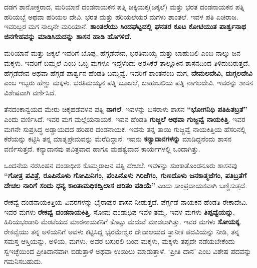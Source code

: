 \vskip -1pt

ದಡಗ ಶಾನೋಕ್ತರಾದ, ಮರಿಯಾನೆ ದಂಡನಾಯಕನ ಪತ್ನಿ ಜಕ್ಕಿಯಕ್ಕ(ಜಕ್ಕಲೆ) ಮತ್ತು ಭರತ ದಂಡನಾಯಕನ ಪತ್ನಿ ಹರಿಯಬ್ಬೆ ಅಥವಾ ಹರಿಯಲ ದೇವಿ. ಭರತ ಮತ್ತು ಹರಿಯಲೆಯರ ಮಗಳು ಶಾಂತಲೆ. ಇವಳ ಪತಿ ಏಚಿರಾಜ. ಇವರಿಬ್ಬರ ಮಗ ನಾಲ್ಕನೇ ಮರಿಯಾನೆ. \textbf{ಶಾಂತಲೆಯು ಸಿಂದಘಟ್ಟದಲ್ಲಿ ಘನತರ ಕೂಟ ಕೋಟಿಯುತ ಪಾರ್ಶ್ವನಾಥ ಜಿನಗೇಹವನ್ನು ಮಾಡಿಸಿದುದನ್ನು ಶಾಸನ ಹಾಡಿ ಹೊಗಳಿದೆ.}

\vskip -1pt

ಮರಿಯಾನೆ ಮತ್ತು ಜಕ್ಕಲೆ ಇವರಿಗೆ ಬೊಪ್ಪ, ಹೆಗ್ಗಡೆದೇವ, ಭರತಿಮಯ್ಯ ಮತ್ತು ಬಾಹುಬಲಿ ಎಂಬ ನಾಲ್ಕು ಜನ ಮಕ್ಕಳು. ಇವರಿಗೆ ಬಮ್ಮಲೆ ಎಂಬ ಒಬ್ಬ ಮಗಳೂ ಇದ್ದಳೆಂದು ಅರಸಿಕೆರೆ ತಾಲ್ಲೂಕಿನ ಶಾಸನದಿಂದ ತಿಳಿದುಬರುತ್ತದೆ. ಹೆಗ್ಗಡೆದೇವ ಅಥವಾ ಹೆಗ್ಗಡೆ ಪಾರ್ಶ್ವನ ಹೆಂಡತಿ ಬಮ್ಮವ್ವೆ. ಇವರಿಗೆ ಶಾಂತನೆಂಬ ಮಗ, \textbf{ದೇಮಲದೇವಿ, ದುಗ್ಗಲದೇವಿ} ಎಂಬ ಇಬ್ಬರು ಹೆಣ್ಣು ಮಕ್ಕಳು. ಭರತಿಮಯ್ಯನ ಪತ್ನಿ ಬೂಚಲೆ, ಬಾಹುಬಲಿಯ ಪತ್ನಿ ನಾಗಲದೇವಿ. ಇವರನ್ನು ಶಾಸನ ವಿಶೇಷವಾಗಿ ವರ್ಣಿಸಿದೆ.

\vskip -1pt

ತೆನದಂಕಾನ್ವಯದ ಮೇರು ಚಿಕ್ಕಹಡೆವಳನ ಪತ್ನಿ \textbf{ನಾಗಲೆ}. ಇವಳನ್ನು ಬಸರಾಳು ಶಾಸನ \textbf{“ಭೋಗನಿಧಿ ಪತಿಹಿತಬ್ರತೆ”} ಎಂದು ವರ್ಣಿಸಿದೆ. ಇವರ ಮಗ ಮಲ್ಲೆಯನಾಯಕ. ಇವನ ಹೆಂಡತಿ \textbf{ಗುಜ್ಜಲೆ ಅಥವಾ ಗುಜ್ಜವ್ವೆ ನಾಯಕಿತ್ತಿ}. ಇವರ ಮಗನೇ ಸುಪ್ರಸಿದ್ಧ ಅಡ್ಡಾಯದದ ಹರಿಹರ ದಂಡನಾಯಕ. ಇವನು ತನ್ನ ತಾಯಿ ಗುಜ್ಜವ್ವೆ ನಾಯಕಿತ್ತಿಯ ಹೆಸರಿನಲ್ಲಿ ಕೆರೆಯನ್ನು ಕಟ್ಟಿಸಿ ತನ್ನ ಮಾತೃಪ್ರೇಮವನ್ನು ಮೆರೆದಿದ್ದಾನೆ. ಇವನು \textbf{ಕನ್ಯಾದಾನಗಳನ್ನು} ಮಾಡಿದ್ದನೆಂದು ಶಾಸನ ವರ್ಣಿಸುತ್ತದೆ. ಕನ್ಯಾದಾನವು ಪವಿತ್ರವಾದ ಹಾಗೂ ಮಹತ್ವವಾದ ಕಾರ್ಯಗಳಲ್ಲಿ ಒಂದಾಗಿತ್ತು.

\vskip -1pt

ಒಂದನೆಯ ನರಸಿಂಹನ ದಂಡಾಧೀಶ ಕೊಮ್ಮರಾಜನ ಪತ್ನಿ ದೇಚಲೆ. ಇವಳನ್ನು ಸುಂಕಾತೊಂಡನೂರು ಶಾಸನವು \textbf{“ಗೋತ್ರ ಪವಿತ್ರೆ, ರೂಪಿನೊಳು ಗೋಮಿನಿಗಂ, ಪೆಂಪಿನೊಳು ಗಿರಿಜೆಗಂ, ಗುಣದೊಳು ಜನಕಾತ್ಮಜೆಗಂ, ಪತಿಬ್ರತೆಗೆ ದೇಚಲ ನಾರಿಗೆ ಸಂದು ಧನ್ಯ ಕಾಂತಾಮಧಿಕದ್ವಿಲಾಸ ಚರಿತಂ ಪಡಿಯೆ”} ಎಂದು ಸಾಂಪ್ರದಾಯಕವಾಗಿ ಬಣ್ಣಿಸುತ್ತದೆ.

\vskip -1pt

ರೇಕವ್ವೆ ದಂಡನಾಯಕಿತ್ತಿಯ ವಿವರಗಳನ್ನು ಭೈರಾಪುರ ಶಾಸನ ನೀಡುತ್ತದೆ. ಪೆರ್ಗ್ಗಡೆ ನಾಯಕನ ಹೆಂಡತಿ ರೇಕಾದೇವಿ. ಇವರ ಮಗಳು \textbf{ರೇಕವ್ವೆ ದಂಡನಾಯಕಿತ್ತಿ}. ಸೋಮ ದಂಡಾಧಿಪ ಇವಳ ತಮ್ಮ. ಇವಳ ಮಗಳು \textbf{ತಿಪ್ಪವ್ವೆಯನ್ನು}, ಹಿರಿಯಭಂಡಾರಿ ಮೆಂಟೆಯದ ಮಾರನಾಯಕನಿಗೆ ಕೊಟ್ಟು ಮದುವೆ ಮಾಡಲಾಗಿತ್ತು. ಇವರ ಮಗಳು \textbf{ಸೋಯಕ್ಕ}. ರೇಕವ್ವೆಯು ತನ್ನ ಅಳಿಯನಿಗೆ ಅವಳು ಕಟ್ಟಿಸಿದ್ದ ಭೈರಮೇಶ್ವರ ದೇವಾಲಯದ ಸ್ಥಾನೀಕ ಪದವಿಯನ್ನು ನೀಡಿ, ತನ್ನ ಸಮಸ್ತ ಆಸ್ತಿಯನ್ನು, ಅಳಿಯ, ಮಗಳು, ಅವರ ಬಸುರಲಿ ಬಂದ ಮಕ್ಕಳು, ಮಕ್ಕಳು ತಪ್ಪದೇ ನಡೆಯಬೇಕೆಂದು ಸ್ವಇಚ್ಛೆಯಿಂದ ಪ್ರೀತಿದಾನವಾಗಿ ಬಿಡುತ್ತಾಳೆ ಅಥವಾ ಉಯಿಲು ಮಾಡುತ್ತಾಳೆ. `ಪ್ರೀತಿ ದಾನ' ಎಂಬ ವಿಶೇಷ ಪದವನ್ನು ಗಮನಿಸಬಹುದು.

